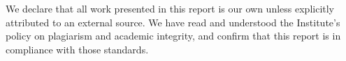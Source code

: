 We declare that all work presented in this report is our own unless explicitly attributed to an external source. We have read and understood the Institute's policy on plagiarism and academic integrity, and confirm that this report is in compliance with those standards.

